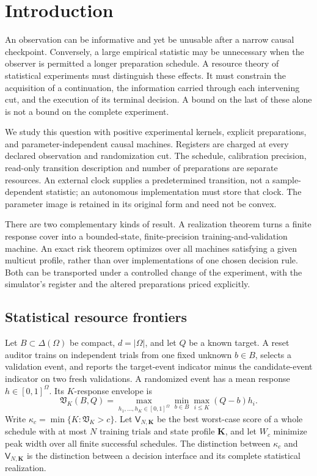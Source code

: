 \section{Introduction}
An observation can be informative and yet be unusable after a narrow
causal checkpoint. Conversely, a large empirical statistic may be
unnecessary when the observer is permitted a longer preparation
schedule. A resource theory of statistical experiments must distinguish
these effects. It must constrain the acquisition of a continuation,
the information carried through each intervening cut, and the execution
of its terminal decision. A bound on the last of these alone is not a
bound on the complete experiment.

We study this question with positive experimental kernels, explicit
preparations, and parameter-independent causal machines. Registers are
charged at every declared observation and randomization cut. The
schedule, calibration precision, read-only transition description and
number of preparations are separate resources. An external clock
supplies a predetermined transition, not a sample-dependent statistic;
an autonomous implementation must store that clock. The parameter
image is retained in its original form and need not be convex.

There are two complementary kinds of result. A realization theorem
turns a finite response cover into a bounded-state, finite-precision
training-and-validation machine. An exact risk theorem optimizes over
all machines satisfying a given multicut profile, rather than over
implementations of one chosen decision rule. Both can be transported
under a controlled change of the experiment, with the simulator's
register and the altered preparations priced explicitly.

\subsection{Statistical resource frontiers}
Let $B\subset\Delta(\Omega)$ be compact, $d=|\Omega|$, and let $Q$ be
a known target. A reset auditor trains on independent trials from one
fixed unknown $b\in B$, selects a validation event, and reports the
target-event indicator minus the candidate-event indicator on two
fresh validations. A randomized event has a mean response
$h\in[0,1]^\Omega$. Its $K$-response envelope is
\[
 \mathfrak V_K(B,Q)=\max_{h_1,\ldots,h_K\in[0,1]^\Omega}
                         \min_{b\in B}\max_{i\le K}(Q-b)h_i.
\]
Write $\kappa_c=\min\{K:\mathfrak V_K>c\}$. Let
$\mathsf V_{N,\boldsymbol K}$ be the best worst-case score of a whole
schedule with at most $N$ training trials and state profile
$\boldsymbol K$, and let $W_c$ minimize peak width over all finite
successful schedules. The distinction between $\kappa_c$ and
$\mathsf V_{N,\boldsymbol K}$ is the distinction between a decision
interface and its complete statistical realization.

